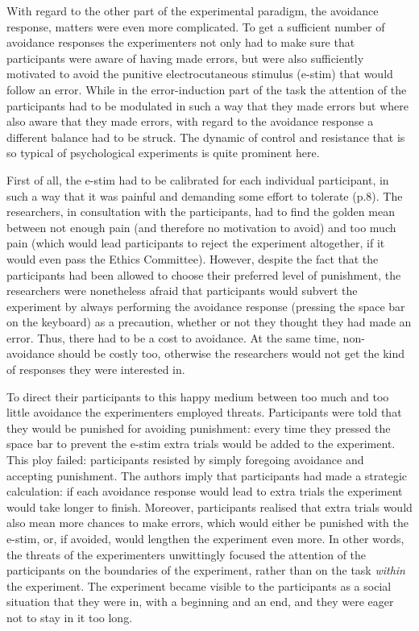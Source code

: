 \documentclass[a4paper]{article}
\begin{document}
With regard to the other part of the experimental paradigm, the avoidance response, matters were even more complicated. To get a sufficient number of avoidance responses the experimenters not only had to make sure that participants were aware of having made errors, but were also sufficiently motivated to avoid the punitive electrocutaneous stimulus (e-stim) that would follow an error. While in the error-induction part of the task the attention of the participants had to be modulated in such a way that they made errors but where also aware that they made errors, with regard to the avoidance response a different balance had to be struck. The dynamic of control and resistance that is so typical of psychological experiments is quite prominent here.

First of all, the e-stim had to be calibrated for each individual participant, in such a way that it was {\textquotedbl}painful and demanding some effort to tolerate{\textquotedbl} (p.8). The researchers, in consultation with the participants, had to find the golden mean between not enough pain (and therefore no motivation to avoid) and too much pain (which would lead participants to reject the experiment altogether, if it would even pass the Ethics Committee). However, despite the fact that the participants had been allowed to choose their preferred level of punishment, the researchers were nonetheless afraid that participants would subvert the experiment by always performing the avoidance response (pressing the space bar on the keyboard) as a precaution, whether or not they thought they had made an error. Thus, there had to be a cost to avoidance. At the same time, non-avoidance should be costly too, otherwise the researchers would not get the kind of responses they were interested in.

To direct their participants to this happy medium between too much and too little avoidance the experimenters employed threats. Participants were told that they would be punished for avoiding punishment: every time they pressed the space bar to prevent the e-stim extra trials would be added to the experiment. This ploy failed: participants resisted by simply foregoing avoidance and accepting punishment. The authors imply that participants had made a strategic calculation: if each avoidance response would lead to extra trials the experiment would take longer to finish. Moreover, participants realised that extra trials would also mean more chances to make errors, which would either be punished with the e-stim, or, if avoided, would lengthen the experiment even more. In other words, the threats of the experimenters unwittingly focused the attention of the participants on the boundaries of the experiment, rather than on the task \textit{within} the experiment. The experiment became visible to the participants as a social situation that they were in, with a beginning and an end, and they were eager not to stay in it too long.
\end{document}
